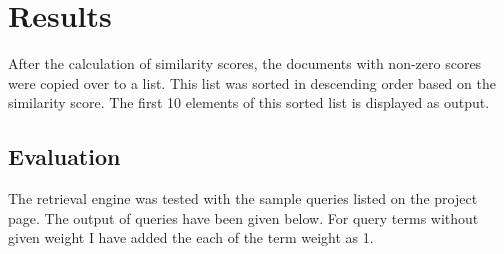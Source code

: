 \documentclass[paper=a4, fontsize=11pt]{scrartcl}
\numberwithin{equation}{section}		%
\numberwithin{figure}{section}			%
\numberwithin{table}{section}				%
\begin{document}
\section{Results}

After the calculation of similarity scores, the documents with non-zero scores were copied over to a list. This list was sorted in descending order based on the similarity score. The first 10 elements of this sorted list is displayed as output.  

\subsection{Evaluation}

The retrieval engine was tested with the sample queries listed on the project page. The output of queries have been given below. For query terms without given weight I have added the each of the term weight as 1.
\end{document}
